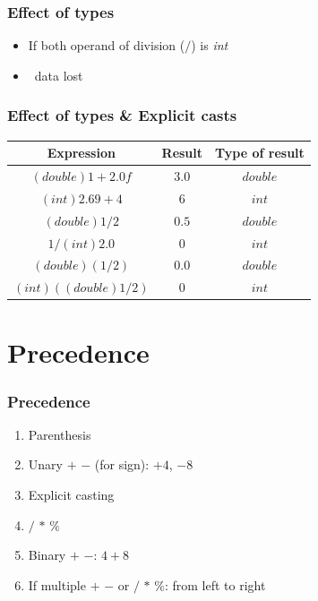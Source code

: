 \documentclass{../c-lecture}
\begin{document}
\begin{frame}
  \frametitle{Effect of types}
  \begin{itemize}
    \item
      If both operand of division ($/$) is \textit{\color{Orange} int}
    \item \textrightarrow\ data lost
  \end{itemize}
\end{frame}

\begin{frame}
  \frametitle{Effect of types \& Explicit casts}
  \begin{table}
  \begin{tabular}{ccc}
    \toprule

    Expression &
    Result &
    Type of result \\

    \midrule

    $(double) 1 + 2.0f$ &
    $3.0$ &
    $double$ \\

    \midrule

    $(int) 2.69 + 4$ &
    $6$ &
    $int$ \\

    \midrule

    $(double) 1 / 2$ &
    $0.5$ &
    $double$ \\

    \midrule

    $1 / (int) 2.0$ &
    $0$ &
    $int$ \\

    \midrule

    $(double) (1 / 2)$ &
    $0.0$ &
    $double$ \\

    \midrule

    $(int)((double) 1 / 2)$ &
    $0$ &
    $int$ \\

    \bottomrule
  \end{tabular}
  \end{table}
\end{frame}

\section{Precedence}

\begin{frame}
  \frametitle{Precedence}
  \begin{enumerate}
    \item Parenthesis
    \item Unary $+$ $-$ (for sign): $+4$, $-8$
    \item Explicit casting
    \item $/$ $*$ $\%$
    \item Binary $+$ $-$: $4 + 8$
    \item If multiple $+$ $-$ or $/$ $*$ $\%$: from left to right
  \end{enumerate}
\end{frame}
\end{document}
